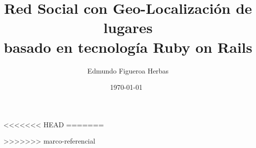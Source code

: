 \documentclass[11pt,letterpaper,oneside,openright]{book}
\title{Red Social con Geo-Localizaci\'on de lugares\\ basado en tecnolog\'ia Ruby on Rails}
\author{Edmundo Figueroa Herbas}
\date{\today \ }
\begin{document}
% 
\frontmatter
  \maketitle
  \tableofcontents

\mainmatter
    
<<<<<<< HEAD
=======
    
>>>>>>> marco-referencial
    

\backmatter
  
\end{document}
